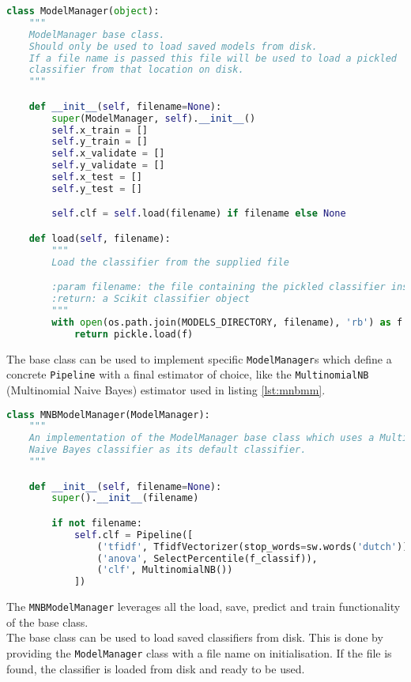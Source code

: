 \begin{lstlisting}[language=python, caption={ModelManager base class}, label={lst:modman}]
class ModelManager(object):
    """
    ModelManager base class.
    Should only be used to load saved models from disk.
    If a file name is passed this file will be used to load a pickled
    classifier from that location on disk.
    """

    def __init__(self, filename=None):
        super(ModelManager, self).__init__()
        self.x_train = []
        self.y_train = []
        self.x_validate = []
        self.y_validate = []
        self.x_test = []
        self.y_test = []

        self.clf = self.load(filename) if filename else None

    def load(self, filename):
        """
        Load the classifier from the supplied file

        :param filename: the file containing the pickled classifier instance
        :return: a Scikit classifier object
        """
        with open(os.path.join(MODELS_DIRECTORY, filename), 'rb') as f:
            return pickle.load(f)
\end{lstlisting}

The base class can be used to implement specific \texttt{ModelManager}s which define a concrete \texttt{Pipeline} with a final estimator of choice, like the \texttt{MultinomialNB} (Multinomial Naive Bayes) estimator used in listing \ref{lst:mnbmm}.\\

\begin{lstlisting}[language=python, caption={ModelManager using the Multinomial Naive Bayes estimator}, label={lst:mnbmm}]
class MNBModelManager(ModelManager):
    """
    An implementation of the ModelManager base class which uses a Multinomial
    Naive Bayes classifier as its default classifier.
    """

    def __init__(self, filename=None):
        super().__init__(filename)

        if not filename:
            self.clf = Pipeline([
                ('tfidf', TfidfVectorizer(stop_words=sw.words('dutch'))),
                ('anova', SelectPercentile(f_classif)),
                ('clf', MultinomialNB())
            ])
\end{lstlisting}

The \texttt{MNBModelManager} leverages all the load, save, predict and train functionality of the base class.\\
The base class can be used to load saved classifiers from disk. This is done by providing the \texttt{ModelManager} class with a file name on initialisation. If the file is found, the classifier is loaded from disk and ready to be used.

